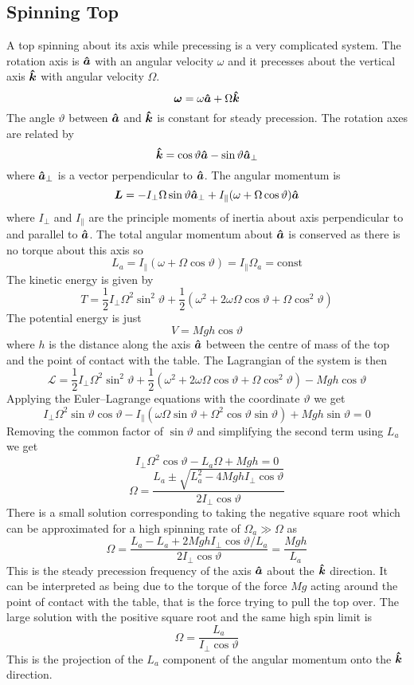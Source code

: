 \documentclass{article}
\newcommand{\vk}{\vh k}
\newcommand{\LL}{\mathcal{L}}
\begin{document}
    \subsection{Spinning Top}
    A top spinning about its axis while precessing is a very complicated system.
    The rotation axis is \(\bm{\hat{a}}\) with an angular velocity \(\omega\) and it precesses about the vertical axis \(\vk\) with angular velocity \(\Omega\).
    \[\vv\omega = \omega\vh a + \Omega\vk\]
    The angle \(\vartheta\) between \(\bm{\hat{a}}\) and \(\vk\) is constant for steady precession. The rotation axes are related by
    \[\vk = \cos\vartheta\vh a - \sin\vartheta\vh a_\perp\]
    where \(\bm{\hat{a}}_\perp\) is a vector perpendicular to \(\bm{\hat{a}}\).
    The angular momentum is
    \[\bm{L} = -I_\perp\Omega\sin\vartheta\bm{\hat{a}}_\perp + I_\parallel(\omega + \Omega\cos\vartheta)\bm{\hat{a}}\]
    where \(I_\perp\) and \(I_\parallel\) are the principle moments of inertia about axis perpendicular to and parallel to \(\bm{\hat{a}}\).
    The total angular momentum about \(\bm{\hat{a}}\) is conserved as there is no torque about this axis so
    \[L_a = I_\parallel(\omega + \Omega\cos\vartheta) = I_\parallel\Omega_a = \text{const}\]
    The kinetic energy is given by
    \[T = \frac{1}{2}I_\perp\Omega^2\sin^2\vartheta + \frac{1}{2}(\omega^2 + 2\omega\Omega\cos\vartheta + \Omega\cos^2\vartheta)\]
    The potential energy is just
    \[V = Mgh\cos\vartheta\]
    where \(h\) is the distance along the axis \(\bm{\hat{a}}\) between the centre of mass of the top and the point of contact with the table.
    The Lagrangian of the system is then
    \[\LL = \frac{1}{2}I_\perp\Omega^2\sin^2\vartheta + \frac{1}{2}(\omega^2 + 2\omega\Omega\cos\vartheta + \Omega\cos^2\vartheta) - Mgh\cos\vartheta\]
    Applying the Euler--Lagrange equations with the coordinate \(\vartheta\) we get
    \[I_\perp\Omega^2\sin\vartheta\cos\vartheta - I_\parallel(\omega\Omega\sin\vartheta + \Omega^2\cos\vartheta\sin\vartheta) + Mgh\sin\vartheta = 0\]
    Removing the common factor of \(\sin\vartheta\) and simplifying the second term using \(L_a\) we get
    \[I_\perp\Omega^2\cos\vartheta - L_a\Omega + Mgh = 0\]
    \[\Omega = \frac{L_a \pm \sqrt{L_a^2 - 4MghI_\perp\cos\vartheta}}{2I_\perp\cos\vartheta}\]
    There is a small solution corresponding to taking the negative square root which can be approximated for a high spinning rate of \(\Omega_a\gg\Omega\) as
    \[\Omega = \frac{L_a - L_a + 2MghI_\perp\cos\vartheta/L_a}{2I_\perp\cos\vartheta} = \frac{Mgh}{L_a}\]
    This is the steady precession frequency of the axis \(\bm{\hat{a}}\) about the \(\vk\) direction.
    It can be interpreted as being due to the torque of the force \(Mg\) acting around the point of contact with the table, that is the force trying to pull the top over.
    The large solution with the positive square root and the same high spin limit is
    \[\Omega = \frac{L_a}{I_\perp\cos\vartheta}\]
    This is the projection of the \(L_a\) component of the angular momentum onto the \(\vk\) direction.
    
\end{document}
